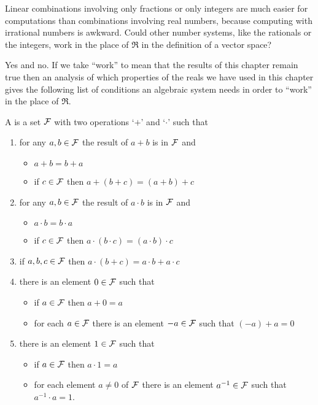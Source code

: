 Linear combinations involving only fractions or only integers are much
easier for computations than combinations involving real numbers,
because computing with irrational numbers is awkward.
Could other number systems, like the rationals or the integers, work in the
place of \( \Re \) in the definition of a vector space?

Yes and no.
If we take ``work'' to mean that the results of this chapter
remain true
then an analysis of which properties of the reals we have
used in this chapter gives the following list of conditions an algebraic system
needs in order to ``work'' in the place of $\Re$.

\begin{shadebox}
\begin{trivlist}
\item[\hskip \labelsep{\bf Definition.}]
A  is a set 
\( \mathcal{F} \) with two operations
`\( + \)'
and `\( \cdot \)' such that
\begin{enumerate}
   \item for any \( a,b\in\mathcal{F} \) the result of \( a+b \) is in \( \mathcal{F} \) and
      \begin{itemize}
         \item \( a+b=b+a \)
         \item if \( c\in\mathcal{F} \) then \( a+(b+c)=(a+b)+c \)
      \end{itemize}
   \item for any \( a,b\in\mathcal{F} \) the result of \( a\cdot b \) is in \( \mathcal{F} \) and
      \begin{itemize}
         \item \( a\cdot b=b\cdot a \)
         \item if \( c\in\mathcal{F} \) then \( a\cdot (b\cdot c)=(a\cdot b)\cdot c \)
      \end{itemize}
   \item if \( a,b,c\in\mathcal{F} \) then \( a\cdot (b+c)=a\cdot b+a\cdot c \)
   \item there is an element \( 0\in\mathcal{F} \) such that
      \begin{itemize}
         \item if \( a\in\mathcal{F} \) then \( a+0=a \)
         \item for each \( a\in\mathcal{F} \) there is an element \( -a\in\mathcal{F} \)
                such that \( (-a)+a=0 \)
      \end{itemize}
   \item there is an element \( 1\in\mathcal{F} \) such that
      \begin{itemize}
         \item if \( a\in\mathcal{F} \) then \( a\cdot 1=a \)
         \item for each element \( a\neq 0 \) of \( \mathcal{F} \)
                there is an element \( a^{-1}\in\mathcal{F} \)
                such that \( a^{-1}\cdot a=1 \).
      \end{itemize}
\end{enumerate}
\end{trivlist}
\end{shadebox}

